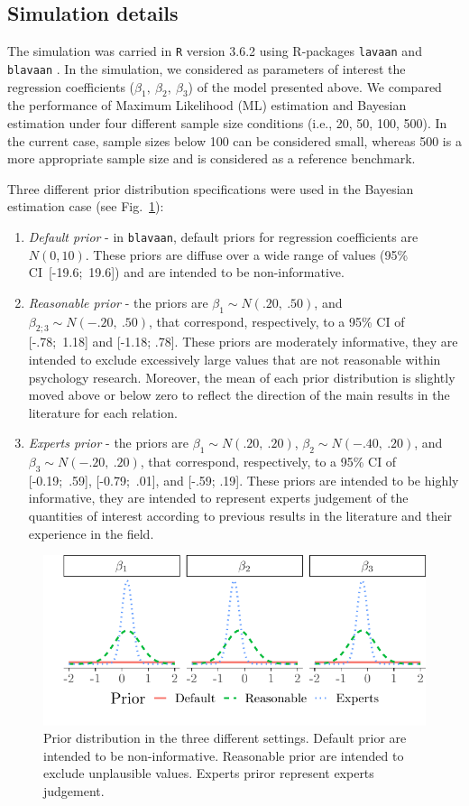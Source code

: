 \documentclass[graybox]{svmult}
\begin{document}
\subsection{Simulation details}

The simulation was carried in \texttt{R} version 3.6.2 \cite{rcoreteamLanguageEnvironmentStatistical2018} using R-packages \texttt{lavaan} \cite{rosseelLavaanPackageStructural2012} and \texttt{blavaan} \cite{merkleBlavaanBayesianStructural2018}. In the simulation, we  considered as parameters of interest the regression coefficients ($\beta_1,\ \beta_2,\ \beta_3$) of the model presented above. We compared the performance of Maximum Likelihood (ML) estimation and Bayesian estimation under four different sample size conditions (i.e., 20, 50, 100, 500). In the current case, sample sizes below 100 can be considered small, whereas 500 is a more appropriate sample size and is considered as a reference benchmark.

Three different prior distribution specifications were used in the Bayesian estimation case (see Fig.~\ref{fig:prior}):
\begin{enumerate}
	\item{\textit{Default prior} -  in \texttt{blavaan}, default priors for regression coefficients are $N(0,10)$}. These priors are diffuse over a wide range of values (95\% CI\ [-19.6;\ 19.6]) and are intended to be non-informative.
	\item{\textit{Reasonable prior} - the priors are $\beta_1\sim N(.20,\ .50)$, and  $\beta_{2;3}\sim N(-.20,\ .50)$, that correspond, respectively, to a 95\% CI of  [-.78;\ 1.18] and  [-1.18; .78]. These priors are moderately informative, they are intended to exclude excessively large values that are not reasonable within psychology research. Moreover, the mean of each prior distribution is slightly moved above or below zero to reflect the direction of the main results in the literature for each relation.}
 	\item{\textit{Experts prior} - the priors are $\beta_1\sim N(.20,\ .20)$,  $\beta_{2}\sim N(-.40,\ .20)$}, and $\beta_3\sim N(-.20,\ .20)$, that correspond, respectively, to a 95\% CI of  [-0.19;\ .59], [-0.79;\ .01], and  [-.59; .19]. These priors are intended to be highly informative, they are intended to represent experts judgement of the quantities of interest according to previous results in the literature and their experience in the field. %
\end{enumerate}
\begin{figure}[b]
	\sidecaption
	\includegraphics[width = .60\textwidth]{figure/Plot_prior}
	\caption{Prior distribution in the three different settings. Default prior are intended to be non-informative. Reasonable prior  are intended to exclude unplausible values. Experts priror represent experts judgement.}
	\label{fig:prior}
\end{figure}
\end{document}
